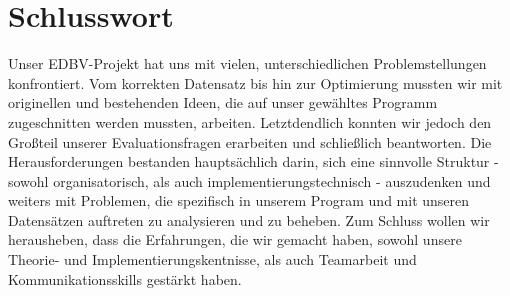 \documentclass[paper=A4, deutsch]{scrartcl}
\begin{document}

\section{Schlusswort}
Unser EDBV-Projekt hat uns mit vielen, unterschiedlichen Problemstellungen konfrontiert. Vom korrekten Datensatz bis hin zur Optimierung mussten wir mit originellen und bestehenden Ideen, die auf unser gewähltes Programm zugeschnitten werden mussten, arbeiten. Letztdendlich konnten wir jedoch den Großteil unserer Evaluationsfragen erarbeiten und schließlich beantworten. Die Herausforderungen bestanden hauptsächlich darin, sich eine sinnvolle Struktur - sowohl organisatorisch, als auch implementierungstechnisch - auszudenken und weiters mit Problemen, die spezifisch in unserem Program und mit unseren Datensätzen auftreten zu analysieren und zu beheben. Zum Schluss wollen wir herausheben, dass die Erfahrungen, die wir gemacht haben, sowohl unsere Theorie- und Implementierungskentnisse, als auch Teamarbeit und Kommunikationsskills gestärkt haben.



\end{document}
